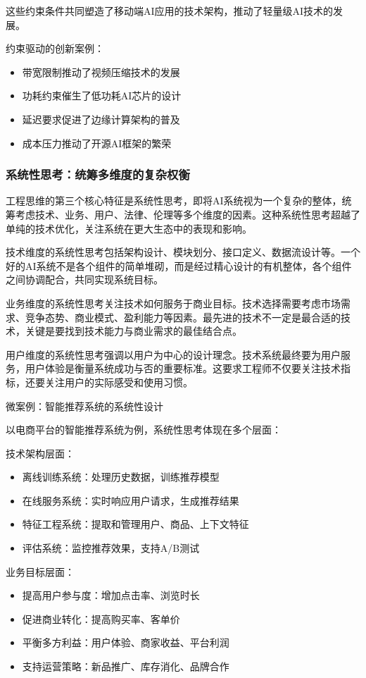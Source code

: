 这些约束条件共同塑造了移动端AI应用的技术架构，推动了轻量级AI技术的发展。

约束驱动的创新案例：

\begin{itemize}
\item 带宽限制推动了视频压缩技术的发展
\item 功耗约束催生了低功耗AI芯片的设计
\item 延迟要求促进了边缘计算架构的普及
\item 成本压力推动了开源AI框架的繁荣
\end{itemize}

\subsubsection{系统性思考：统筹多维度的复杂权衡}

工程思维的第三个核心特征是系统性思考，即将AI系统视为一个复杂的整体，统筹考虑技术、业务、用户、法律、伦理等多个维度的因素。这种系统性思考超越了单纯的技术优化，关注系统在更大生态中的表现和影响。

技术维度的系统性思考包括架构设计、模块划分、接口定义、数据流设计等。一个好的AI系统不是各个组件的简单堆砌，而是经过精心设计的有机整体，各个组件之间协调配合，共同实现系统目标。

业务维度的系统性思考关注技术如何服务于商业目标。技术选择需要考虑市场需求、竞争态势、商业模式、盈利能力等因素。最先进的技术不一定是最合适的技术，关键是要找到技术能力与商业需求的最佳结合点。

用户维度的系统性思考强调以用户为中心的设计理念。技术系统最终要为用户服务，用户体验是衡量系统成功与否的重要标准。这要求工程师不仅要关注技术指标，还要关注用户的实际感受和使用习惯。

微案例：智能推荐系统的系统性设计

以电商平台的智能推荐系统为例，系统性思考体现在多个层面：

技术架构层面：
\begin{itemize}
\item 离线训练系统：处理历史数据，训练推荐模型
\item 在线服务系统：实时响应用户请求，生成推荐结果
\item 特征工程系统：提取和管理用户、商品、上下文特征
\item 评估系统：监控推荐效果，支持A/B测试
\end{itemize}

业务目标层面：
\begin{itemize}
\item 提高用户参与度：增加点击率、浏览时长
\item 促进商业转化：提高购买率、客单价
\item 平衡多方利益：用户体验、商家收益、平台利润
\item 支持运营策略：新品推广、库存消化、品牌合作
\end{itemize}

